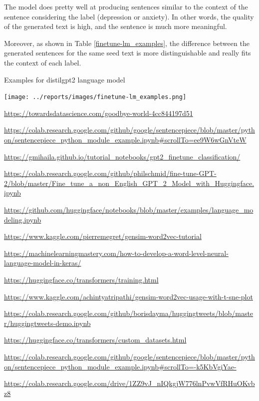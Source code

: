\documentclass[12pt, a4paper]{article}
\begin{document}
	The model does pretty well at producing sentences similar to the context of the sentence considering the label (depression or anxiety). In other words, the quality of the generated text is high, and the sentence is much more meaningful. 
	
	Moreover, as shown in Table \ref{finetune-lm_examples}, the difference between the generated sentences for the same seed text is more distinguishable and really fits the context of each label.
	
	\begin{table}[H]
		\caption{Examples for distilgpt2 language model}
		\centering
		\texttt{[image: ../reports/images/finetune-lm\_examples.png]}	
		\label{finetune-lm_examples}
	\end{table}
	
	
	\newpage
	\begin{thebibliography}{9}
		\url{https://towardsdatascience.com/goodbye-world-4cc844197d51}
		
		\url{https://colab.research.google.com/github/google/sentencepiece/blob/master/python/sentencepiece_python_module_example.ipynb#scrollTo=ee9W6wGnVteW}
		
		\url{https://gmihaila.github.io/tutorial_notebooks/gpt2_finetune_classification/}
		
		\url{https://colab.research.google.com/github/philschmid/fine-tune-GPT-2/blob/master/Fine_tune_a_non_English_GPT_2_Model_with_Huggingface.ipynb}
		
		\url{https://github.com/huggingface/notebooks/blob/master/examples/language_modeling.ipynb}
		
		\url{https://www.kaggle.com/pierremegret/gensim-word2vec-tutorial}
		
		\url{https://machinelearningmastery.com/how-to-develop-a-word-level-neural-language-model-in-keras/}
		
		\url{https://huggingface.co/transformers/training.html}
		
		\url{https://www.kaggle.com/achintyatripathi/gensim-word2vec-usage-with-t-sne-plot}
		
		\url{https://colab.research.google.com/github/borisdayma/huggingtweets/blob/master/huggingtweets-demo.ipynb}
		
		\url{https://huggingface.co/transformers/custom_datasets.html}
		
		\url{https://colab.research.google.com/github/google/sentencepiece/blob/master/python/sentencepiece_python_module_example.ipynb#scrollTo=-k5KbVgiYae-}
		
		\url{https://colab.research.google.com/drive/1ZZ9vJ_nIQkgjW776lnPvwVfRHuOKvbz8}
		
	\end{thebibliography}
	
\end{document}
